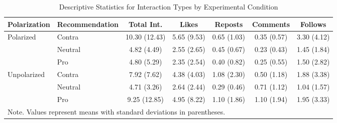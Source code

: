 \begin{table}[htbp]
\centering
\caption{Descriptive Statistics for Interaction Types by Experimental Condition}
\begin{tabular}{llccccc}
\hline
Polarization & Recommendation & Total Int. & Likes & Reposts & Comments & Follows \\
\hline
\multirow{3}{*}{Polarized} 
    & Contra & 10.30 (12.43) & 5.65 (9.53) & 0.65 (1.03) & 0.35 (0.57) & 3.30 (4.12) \\
    & Neutral & 4.82 (4.49) & 2.55 (2.65) & 0.45 (0.67) & 0.23 (0.43) & 1.45 (1.84) \\
    & Pro & 4.80 (5.29) & 2.35 (2.54) & 0.40 (0.82) & 0.25 (0.55) & 1.50 (2.82) \\[0.5ex]
\multirow{3}{*}{Unpolarized} 
    & Contra & 7.92 (7.62) & 4.38 (4.03) & 1.08 (2.30) & 0.50 (1.18) & 1.88 (3.38) \\
    & Neutral & 4.71 (3.26) & 2.64 (2.44) & 0.29 (0.46) & 0.71 (1.12) & 1.04 (1.57) \\
    & Pro & 9.25 (12.85) & 4.95 (8.22) & 1.10 (1.86) & 1.10 (1.94) & 1.95 (3.33) \\
\hline
\multicolumn{7}{p{.95\linewidth}}{\small Note. Values represent means with standard deviations in parentheses.}
\end{tabular}
\label{tab:descriptives}
\end{table}